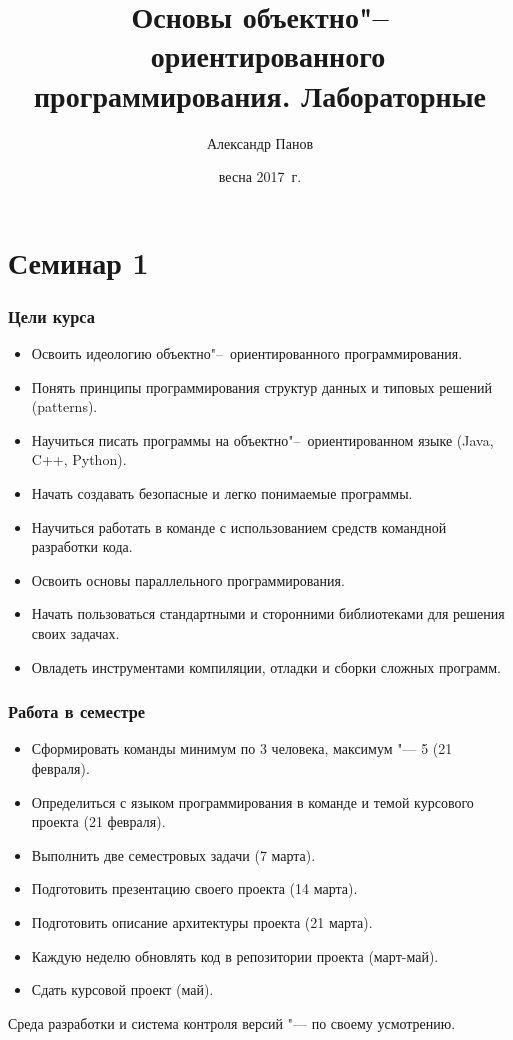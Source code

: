 \documentclass[default]{beamer}
\begin{document}
	
	\title[ООП. Лабораторные]{Основы объектно"--~ориентированного программирования.
		Лабораторные}
	\author[Панов]{Александр Панов}
	\date{весна 2017~г.} 
	
	\begin{frame}
		\titlepage
	\end{frame}
	
	\section {Семинар 1}
	
	\begin{frame}
		\frametitle{Цели курса}
		
		\begin{itemize}
			\item Освоить идеологию объектно"--~ориентированного программирования.
			\item Понять принципы программирования структур данных и типовых решений
			(patterns).
			\item Научиться писать программы на объектно"--~ориентированном языке (Java,
			C++, Python).
			\item Начать создавать безопасные и легко понимаемые программы.
			\item Научиться работать в команде с использованием средств командной
			разработки кода.
			\item Освоить основы параллельного программирования.
			\item Начать пользоваться стандартными и сторонними библиотеками для решения
			своих задачах.
			\item Овладеть инструментами компиляции, отладки и сборки сложных программ.
		\end{itemize}
	\end{frame}
	
	\begin{frame}
		\frametitle{Работа в семестре}
		
		\begin{itemize}
			\item Сформировать команды минимум по 3 человека, максимум "--- 5 (21 февраля).
			\item Определиться с языком программирования в команде и темой курсового
			проекта (21 февраля).
			\item Выполнить две семестровых задачи (7 марта).
			\item Подготовить презентацию своего проекта (14 марта).
			\item Подготовить описание архитектуры проекта (21 марта).
			\item Каждую неделю обновлять код в репозитории проекта (март-май).
			\item Сдать курсовой проект (май).
		\end{itemize}
		
		\par\bigskip
		Среда разработки и система контроля версий "--- по своему усмотрению.
	\end{frame}
	
\end{document}
